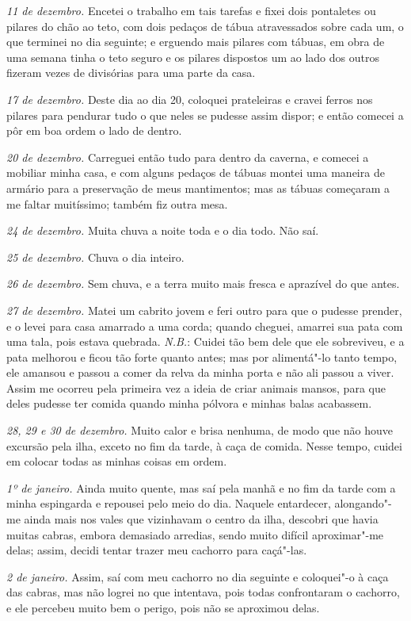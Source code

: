 \emph{11 de dezembro.} Encetei o trabalho em tais tarefas e fixei dois
pontaletes ou pilares do chão ao teto, com dois pedaços de tábua
atravessados sobre cada um, o que terminei no dia seguinte; e erguendo
mais pilares com tábuas, em obra de uma semana tinha o teto seguro e os
pilares dispostos um ao lado dos outros fizeram vezes de divisórias para
uma parte da casa.

\emph{17 de dezembro.} Deste dia ao dia 20, coloquei prateleiras e
cravei ferros nos pilares para pendurar tudo o que neles se pudesse
assim dispor; e então comecei a pôr em boa ordem o lado de dentro.

\emph{20 de dezembro.} Carreguei então tudo para dentro da caverna, e
comecei a mobiliar minha casa, e com alguns pedaços de tábuas montei uma
maneira de armário para a preservação de meus mantimentos; mas as tábuas
começaram a me faltar muitíssimo; também fiz outra mesa.

\emph{24 de dezembro.} Muita chuva a noite toda e o dia todo. Não saí.

\emph{25 de dezembro.} Chuva o dia inteiro.

\emph{26 de dezembro.} Sem chuva, e a terra muito mais fresca e
aprazível do que antes.

\emph{27 de dezembro.} Matei um cabrito jovem e feri outro para que o
pudesse prender, e o levei para casa amarrado a uma corda; quando
cheguei, amarrei sua pata com uma tala, pois estava quebrada.
\emph{N.B.}: Cuidei tão bem dele que ele sobreviveu, e a pata melhorou e
ficou tão forte quanto antes; mas por alimentá"-lo tanto tempo, ele
amansou e passou a comer da relva da minha porta e não ali passou a
viver. Assim me ocorreu pela primeira vez a ideia de criar animais
mansos, para que deles pudesse ter comida quando minha pólvora e minhas
balas acabassem.

\emph{28, 29 e 30 de dezembro.} Muito calor e brisa nenhuma, de modo que
não houve excursão pela ilha, exceto no fim da tarde, à caça de comida.
Nesse tempo, cuidei em colocar todas as minhas coisas em ordem.

\emph{1º de janeiro.} Ainda muito quente, mas saí pela manhã e no fim da
tarde com a minha espingarda e repousei pelo meio do dia. Naquele
entardecer, alongando"-me ainda mais nos vales que vizinhavam o centro da
ilha, descobri que havia muitas cabras, embora demasiado arredias, sendo
muito difícil aproximar"-me delas; assim, decidi tentar trazer meu
cachorro para caçá"-las.

\emph{2 de janeiro.} Assim, saí com meu cachorro no dia seguinte e
coloquei"-o à caça das cabras, mas não logrei no que intentava, pois
todas confrontaram o cachorro, e ele percebeu muito bem o perigo, pois
não se aproximou delas.


